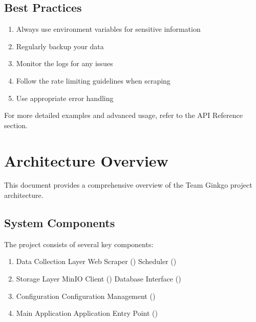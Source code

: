 \documentclass[letterpaper,10pt,english]{sphinxmanual}
\begin{document}
\section{Best Practices}
\label{\detokenize{usage:best-practices}}\begin{enumerate}
%
\item {} 
\sphinxAtStartPar
Always use environment variables for sensitive information

\item {} 
\sphinxAtStartPar
Regularly backup your data

\item {} 
\sphinxAtStartPar
Monitor the logs for any issues

\item {} 
\sphinxAtStartPar
Follow the rate limiting guidelines when scraping

\item {} 
\sphinxAtStartPar
Use appropriate error handling

\end{enumerate}

\sphinxAtStartPar
For more detailed examples and advanced usage, refer to the API Reference section.

\sphinxstepscope


\chapter{Architecture Overview}
\label{\detokenize{architecture:architecture-overview}}\label{\detokenize{architecture:architecture}}\label{\detokenize{architecture::doc}}
\sphinxAtStartPar
This document provides a comprehensive overview of the Team Ginkgo project architecture.


\section{System Components}
\label{\detokenize{architecture:system-components}}
\sphinxAtStartPar
The project consists of several key components:
\begin{enumerate}
%
\item {} 
\sphinxAtStartPar
Data Collection Layer
\sphinxhyphen{} Web Scraper ()
\sphinxhyphen{} Scheduler ()

\item {} 
\sphinxAtStartPar
Storage Layer
\sphinxhyphen{} MinIO Client ()
\sphinxhyphen{} Database Interface ()

\item {} 
\sphinxAtStartPar
Configuration
\sphinxhyphen{} Configuration Management ()

\item {} 
\sphinxAtStartPar
Main Application
\sphinxhyphen{} Application Entry Point ()

\end{enumerate}
\end{document}
